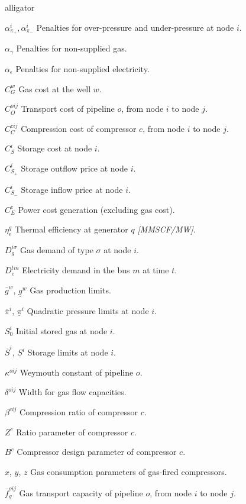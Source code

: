 \begin{labeling}{alligator}

\item [$\alpha^{i}_{\pi_+}, \alpha^{i}_{\pi _-}$] Penalties for over-pressure and under-pressure at node $i$.
\item [$\alpha_{\gamma}$] Penalties for non-supplied gas.
\item [$\alpha_{\epsilon}$] Penalties for non-supplied electricity.
\item [$C^{w}_{G}$] Gas cost at the well $w$.
\item [$C^{oij}_{O}$] Transport cost of pipeline $o$, from node $i$ to node $j$.
\item [$C^{cij}_{C}$] Compression cost of compressor $c$, from node $i$ to node $j$.
\item [$C^{i}_{S}$] Storage cost at node $i$.
\item [$C^{i}_{S_+}$] Storage outflow price at node $i$.
\item [$C^{i}_{S_-}$] Storage inflow price at node $i$.
\item [$C^{e}_{E}$] Power cost generation (excluding gas cost).
\item [$\eta^{q}_{e}$] Thermal efficiency at generator $q$ \textit{[MMSCF/MW]}.
\item [$D_{g}^{i \sigma}$] Gas demand of type $\sigma$ at node $i$.
\item [$D_{e}^{tm}$] Electricity demand in the bus $m$ at time $t$.
\item [$\bar{g}^{w}$, $\underline{g}^{w}$] Gas production limits.
\item [$\overline{\pi}^{i}$, $\underline{\pi}^{i}$] Quadratic pressure limits at node $i$.
\item [$S^{i}_{0}$] Initial stored gas at node $i$.
\item [$\overline{S}^{i}$, $\underline{S}^{i}$] Storage limits at node $i$.
\item [$\kappa^{oij}$] Weymouth constant of pipeline $o$.
\item [$\delta^{oij}$] Width for gas flow capacities.
\item [$\beta^{cij}$] Compression ratio of compressor $c$.
\item [$Z^{c}$] Ratio parameter of compressor $c$.
\item [$B^{c}$] Compressor design parameter of compressor $c$.
\item [$x$, $y$, $z$] Gas consumption parameters of gas-fired compressors.
\item [$\overline{f}^{oij}_{g}$] Gas transport capacity of pipeline $o$, from node $i$ to node $j$.

\end{labeling}

